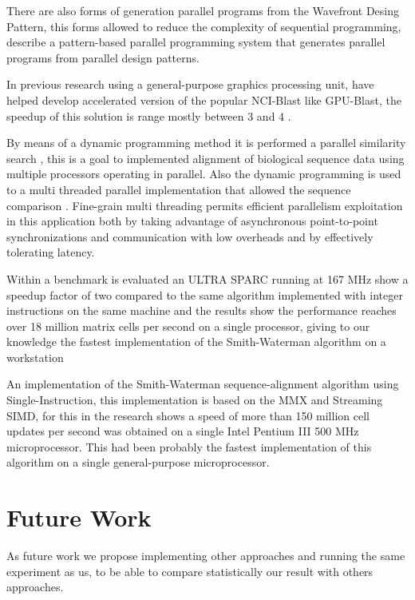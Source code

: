 \documentclass[journal]{IEEEtran}
\begin{document}
There are also forms of generation parallel programs from the Wavefront Desing Pattern, this forms allowed to reduce the complexity of sequential programming, \cite{anvik2001generating} describe a pattern-based parallel programming system that generates parallel programs from parallel design patterns.

In previous research using a general-purpose graphics processing unit, have helped develop accelerated version of the popular NCI-Blast like GPU-Blast, the speedup of this solution is range mostly between 3 and 4 \cite{hughey1996parallel}.

By means of a dynamic programming method it is performed a parallel similarity search \cite{galper1990parallel}, this is a goal to implemented alignment of biological sequence data using multiple processors operating in parallel. Also the dynamic programming is used to a multi threaded parallel implementation that allowed the sequence comparison \cite{martins2001multithreaded}. Fine-grain multi threading permits efficient parallelism exploitation in this application both by taking advantage of asynchronous point-to-point synchronizations and communication with low overheads and by effectively tolerating latency.

Within a benchmark is evaluated an ULTRA SPARC running at 167 MHz show a speedup factor of two compared to the same algorithm implemented with integer instructions on the same machine and the results show the performance reaches over 18 million matrix cells per second on a single processor, giving to our knowledge the fastest implementation of the Smith-Waterman algorithm on a workstation \cite{wozniak1997using}

An implementation of the Smith-Waterman sequence-alignment algorithm using Single-Instruction, this implementation is based on the MMX and Streaming SIMD, for this in \cite{rognes2000six} the research shows a speed of more than 150 million cell updates per second was obtained on a single Intel Pentium III 500 MHz microprocessor. This had been probably the fastest implementation of this algorithm on a single general-purpose microprocessor. 


\section{Future Work}

As future work we propose implementing other approaches and running the same experiment as us, to be able to compare statistically our result with others approaches. 
\end{document}
